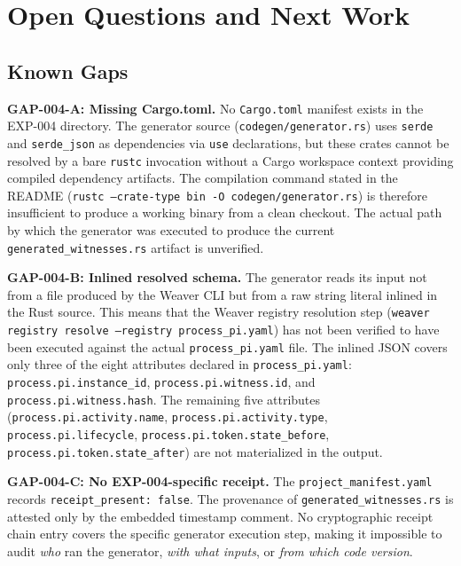 
\section{Open Questions and Next Work}
\label{sec:otel-weaver-exp-004-registry-to-witness-gaps}

\subsection{Known Gaps}
\label{sec:otel-weaver-exp-004-registry-to-witness-known-gaps}

\textbf{GAP-004-A: Missing Cargo.toml.} No \texttt{Cargo.toml} manifest exists in the
EXP-004 directory. The generator source (\texttt{codegen/generator.rs}) uses
\texttt{serde} and \texttt{serde\_json} as dependencies via \texttt{use} declarations, but
these crates cannot be resolved by a bare \texttt{rustc} invocation without a Cargo
workspace context providing compiled dependency artifacts. The compilation command stated
in the README (\texttt{rustc --crate-type bin -O codegen/generator.rs}) is therefore
insufficient to produce a working binary from a clean checkout. The actual path by which
the generator was executed to produce the current \texttt{generated\_witnesses.rs} artifact
is unverified.

\textbf{GAP-004-B: Inlined resolved schema.} The generator reads its input not from a
file produced by the Weaver CLI but from a raw string literal inlined in the Rust source.
This means that the Weaver registry resolution step (\texttt{weaver registry resolve
--registry process\_pi.yaml}) has not been verified to have been executed against the
actual \texttt{process\_pi.yaml} file. The inlined JSON covers only three of the eight
attributes declared in \texttt{process\_pi.yaml}: \texttt{process.pi.instance\_id},
\texttt{process.pi.witness.id}, and \texttt{process.pi.witness.hash}. The remaining five
attributes (\texttt{process.pi.activity.name}, \texttt{process.pi.activity.type},
\texttt{process.pi.lifecycle}, \texttt{process.pi.token.state\_before},
\texttt{process.pi.token.state\_after}) are not materialized in the output.

\textbf{GAP-004-C: No EXP-004-specific receipt.} The \texttt{project\_manifest.yaml}
records \texttt{receipt\_present: false}. The provenance of \texttt{generated\_witnesses.rs}
is attested only by the embedded timestamp comment. No cryptographic receipt chain entry
covers the specific generator execution step, making it impossible to audit \emph{who}
ran the generator, \emph{with what inputs}, or \emph{from which code version}.

